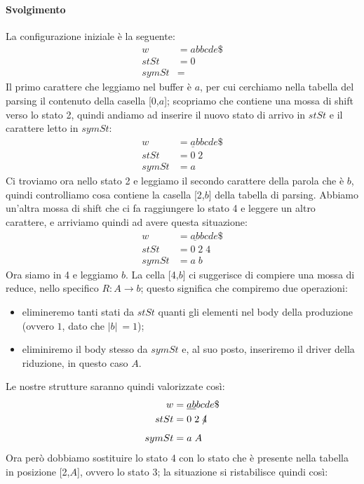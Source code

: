 \documentclass[class=book, crop=false, oneside, 12pt]{standalone}
\begin{document}
\paragraph{Svolgimento}
La configurazione iniziale è la seguente:
\begin{align*}
    w &= abbcde\$ \\
    stSt &= 0 \\
    symSt &= 
\end{align*}
Il primo carattere che leggiamo nel buffer è \(a\), per cui cerchiamo nella tabella del parsing il contenuto della casella [0,\(a\)]; scopriamo che contiene una mossa di shift verso lo stato 2, quindi andiamo ad inserire il nuovo stato di arrivo in \(stSt\) e il carattere letto in \(symSt\):
\begin{align*}
    w &= \underline{a}bbcde\$ \\
    stSt &= 0\;2\\
    symSt &= a
\end{align*}
Ci troviamo ora nello stato 2 e leggiamo il secondo carattere della parola che è \(b\), quindi controlliamo cosa contiene la casella [2,\(b\)] della tabella di parsing. Abbiamo un'altra mossa di shift che ci fa raggiungere lo stato 4 e leggere un altro carattere, e arriviamo quindi ad avere questa situazione:
\begin{align*}
    w &= \underline{ab}bcde\$ \\
    stSt &= 0\;2\;4\\
    symSt &= a\;b
\end{align*}
Ora siamo in 4 e leggiamo \(b\). La cella [4,\(b\)] ci suggerisce di compiere una mossa di reduce, nello specifico \(R: A \to b\); questo significa che compiremo due operazioni:
\begin{itemize}
    \item elimineremo tanti stati da \(stSt\) quanti gli elementi nel body della produzione (ovvero \(1\), dato che \(|b|\ = 1\));
    \item eliminiremo il body stesso da \(symSt\) e, al suo posto, inseriremo il driver della riduzione, in questo caso \(A\).
\end{itemize} 
Le nostre strutture saranno quindi valorizzate così: 
\begin{align*}
    w &= \underline{ab}bcde\$ \\
    stSt &= 0\;2\;\xout{4}\\
    symSt &= a\;A
\end{align*}
Ora però dobbiamo sostituire lo stato 4 con lo stato che è presente nella tabella in posizione [2,\(A\)], ovvero lo stato 3; la situazione si ristabilisce quindi così:
\end{document}
